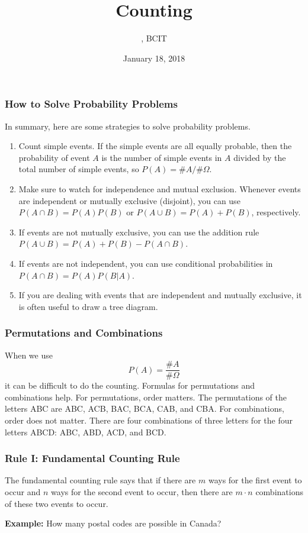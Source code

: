 \documentclass[xcolor=dvipsnames]{beamer}
\title{Counting}
\subtitle{{\CourseNumber}, BCIT}
\author{\CourseName}
\date{January 18, 2018}
\begin{document}
\begin{frame}
  \titlepage
\end{frame}

\begin{frame}
  \frametitle{How to Solve Probability Problems}
In summary, here are some strategies to solve probability problems.
\begin{enumerate}
\item Count simple events. If the simple events are all equally
  probable, then the probability of event $A$ is the number of simple
  events in $A$ divided by the total number of simple events, so
  $P(A)=\#A/\#\Omega$.
\item Make sure to watch for independence and mutual exclusion.
  Whenever events are independent or mutually exclusive (disjoint),
  you can use $P(A\cap{}B)=P(A)P(B)$ or $P(A\cup{}B)=P(A)+P(B)$,
  respectively.
\item If events are not mutually exclusive, you can use the
  addition rule $P(A\cup{}B)=P(A)+P(B)-P(A\cap{}B)$.
\item If events are not independent, you can use conditional
  probabilities in $P(A\cap{}B)=P(A)P(B|A)$.
\item If you are dealing with events that are independent and
  mutually exclusive, it is often useful to draw a tree diagram.
\end{enumerate}
\end{frame}

\begin{frame}
  \frametitle{Permutations and Combinations}
When we use
\begin{equation}
  \label{eq:adeiquah}
  P(A)=\frac{\#A}{\#\Omega}
\end{equation}
it can be difficult to do the counting. Formulas for permutations and
combinations help. For \alert{permutations}, order matters. The
permutations of the letters ABC are ABC, ACB, BAC, BCA, CAB, and CBA.
For \alert{combinations}, order does not matter. There are four
combinations of three letters for the four letters ABCD: ABC, ABD,
ACD, and BCD.
\end{frame}

\begin{frame}
  \frametitle{Rule I: Fundamental Counting Rule}
  The fundamental counting rule says that if there are $m$ ways for
  the first event to occur and $n$ ways for the second event to occur,
  then there are $m\cdot{}n$ combinations of these two events to
  occur.

\bigskip

\textbf{Example:} How many postal codes are possible in Canada?
\end{frame}
\end{document}
